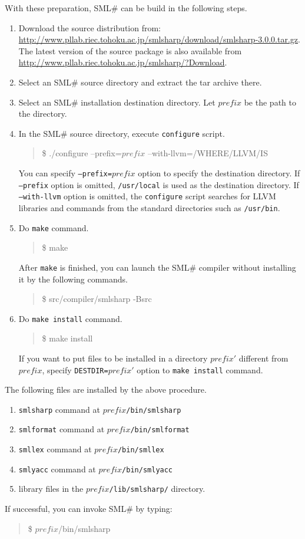 \documentclass{jbook}
\newcommand{\smlsharp}{SML\#}
\newcommand{\version}{3.0.0}
\newcommand\eurl[1]{{\edef\eurlTMP{{#1}}\expandafter\url\eurlTMP}}
\newenvironment{program}{\begin{quote}\begin{tt}}%
                        {\end{tt}\end{quote}}
\begin{document}
	With these preparation, \smlsharp{} can be build in the
following steps.
\begin{enumerate}
\item Download the source distribution from:
\eurl{http://www.pllab.riec.tohoku.ac.jp/smlsharp/download/smlsharp-\version.tar.gz}.
	The latest version of the source package is also available from
\url{http://www.pllab.riec.tohoku.ac.jp/smlsharp/?Download}.
\item Select an \smlsharp{} source directory and extract the tar archive there.
\item Select an \smlsharp{} installation destination directory.
Let $\mathit{prefix}$ be the path to the directory.
\item
	In the \smlsharp{} source directory, execute {\tt configure} script.
\begin{program}
\$ ./configure --prefix=$\mathit{prefix}$ --with-llvm=/WHERE/LLVM/IS
\end{program}
	You can specify {\tt --prefix=$\mathit{prefix}$} option to specify
the destination directory.
	If {\tt --prefix} option is omitted, {\tt /usr/local} is used as
the destination directory.
	If {\tt --with-llvm} option is omitted, the {\tt configure} script
searches for LLVM libraries and commands from the standard directories
such as {\tt /usr/bin}.

\item
	Do {\tt make} command.
\begin{program}
\$ make
\end{program}
	After {\tt make} is finished,
you can launch the \smlsharp{} compiler
without installing it
by the following commands.
\begin{program}
\$ src/compiler/smlsharp -Bsrc
\end{program}
\item
	Do {\tt make install} command.
\begin{program}
\$ make install
\end{program}
	If you want to put files to be installed in a directory
$\mathit{prefix}'$ different from $\mathit{prefix}$, specify
{\tt DESTDIR=$\mathit{prefix}'$} option to {\tt make install} command.
\end{enumerate}

	The following files are installed by the above procedure.
\begin{enumerate}
\item {\tt smlsharp} command at {\tt $\mathit{prefix}$/bin/smlsharp}
\item {\tt smlformat} command at {\tt $\mathit{prefix}$/bin/smlformat}
\item {\tt smllex} command at {\tt $\mathit{prefix}$/bin/smllex}
\item {\tt smlyacc} command at {\tt $\mathit{prefix}$/bin/smlyacc}
\item library files in the {\tt $\mathit{prefix}$/lib/smlsharp/} directory.
\end{enumerate}
	If successful, you can invoke \smlsharp{} by typing:
\begin{program}
\$ $\mathit{prefix}$/bin/smlsharp
\end{program}
\end{document}
